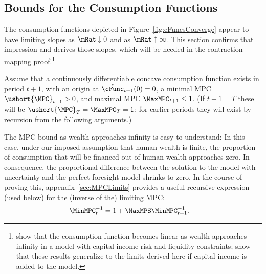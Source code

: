 \documentclass[BufferStockTheory]{subfiles}
\begin{document}
\hypertarget{Bounds-for-the-Consumption-Functions}{}
\subsection{Bounds for the Consumption Functions}\label{subsec:cFuncBounds}

The consumption functions depicted in Figure~\ref{fig:cFuncsConverge} appear
to have limiting slopes as $\mRat \downarrow 0$ and as $\mRat \uparrow
\infty$.  This section confirms that impression and derives those
slopes, which will be needed in the contraction mapping proof.\footnote{\cite{benhabibWealth} show that the consumption function
  becomes linear as wealth approaches infinity in a model with capital income risk and liquidity
  constraints; \cite{maTodaRich} show that these results generalize to the limits derived here if capital income is added to the model.}

\newcommand{\NewMaxMinMPC}{\ushort{\MPC}}

Assume that a continuously differentiable concave consumption function exists in period $t+1$, with an origin at
$\mathring{\cFunc}_{t+1}(0)=0$, a minimal MPC $\NewMaxMinMPC_{t+1}>0$, and
maximal MPC $\MaxMPC_{t+1} \leq 1$.  (If $t+1 = T$ these will be
$\NewMaxMinMPC_{T}=\MaxMPC_{T}=1$; for earlier periods they will exist
by recursion from the following arguments.)

The MPC bound as wealth approaches infinity is easy to understand: In this case, under our imposed assumption that human wealth is finite, the proportion of consumption that will be financed out of human wealth approaches zero. In consequence, the proportional difference between the solution to the model with uncertainty and the perfect foresight model shrinks to zero.  \hypertarget{MPCnvrsLower}{}
In the course of proving this, appendix~\ref{sec:MPCLimits} provides a useful recursive expression (used below) for the (inverse of the) limiting MPC: \hypertarget{WRICCond}{}
\begin{align}
  \MinMPC_{t}^{-1}  & = 1+\MaxMPS \MinMPC_{t+1}^{-1} \label{eq:MinMPCInv}.
\end{align}
\end{document}

